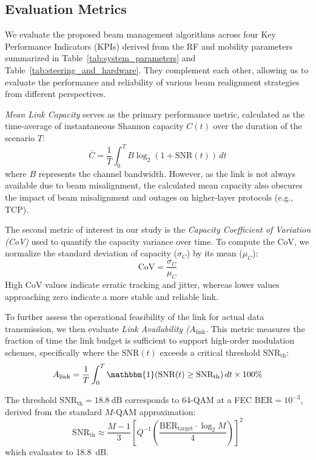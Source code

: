 \documentclass[fleqn,10pt]{wlscirep}
\begin{document}
\subsection*{Evaluation Metrics}
We evaluate the proposed beam management algorithms across four Key Performance Indicators (KPIs) derived from the RF and mobility parameters summarized in Table~\ref{tab:system_parameters} and Table~\ref{tab:steering_and_hardware}. They complement each other, allowing us to evaluate the performance and reliability of various beam realignment strategies from different perspectives.

\emph{Mean Link Capacity} serves as the primary performance metric, calculated as the time-average of instantaneous Shannon capacity $C(t)$ over the duration of the scenario $T$:
\begin{equation}
    \bar{C} = \frac{1}{T} \int_{0}^{T} B \log_2(1 + \text{SNR}(t)) \, dt
\end{equation}
where $B$ represents the channel bandwidth. However, as the link is not always available due to beam misalignment, the calculated mean capacity also obscures the impact of beam misalignment and outages on higher-layer protocols (e.g., TCP).

The second metric of interest in our study is the \emph{Capacity Coefficient of Variation (CoV)} used to quantify the capacity variance over time.
To compute the CoV, we normalize the standard deviation of capacity ($\sigma_C$) by its mean ($\mu_C$):
\begin{equation}
    \text{CoV} = \frac{\sigma_C}{\mu_C}
\end{equation}
High CoV values indicate erratic tracking and jitter, whereas lower values approaching zero indicate a more stable and reliable link.

To further assess the operational feasibility of the link for actual data transmission, we then evaluate \emph{Link Availability ($A_{\text{link}}$}. This metric measures the fraction of time the link budget is sufficient to support high-order modulation schemes, specifically where the $\text{SNR}(t)$ exceeds a critical threshold $\text{SNR}_{\text{th}}$:
\begin{equation}
    A_{\text{link}} = \frac{1}{T} \int_{0}^{T} \mathbbm{1}\!\left(\text{SNR}(t) \geq \text{SNR}_{\text{th}}\right) dt \times 100\%
\end{equation}

The threshold $\text{SNR}_{\text{th}} = \SI{18.8}{\deci\bel}$ corresponds to 64-QAM at a FEC $\text{BER} = 10^{-3}$, derived from the standard $M$-QAM approximation\cite{Proakis2008}:
\begin{equation}
    \text{SNR}_{\text{th}} \approx \frac{M-1}{3} \left[ Q^{-1} \left( \frac{\text{BER}_{\text{target}} \cdot \log_2 M}{4} \right) \right]^2
\end{equation}
which evaluates to \SI{18.8}{\deci\bel}.
\end{document}
